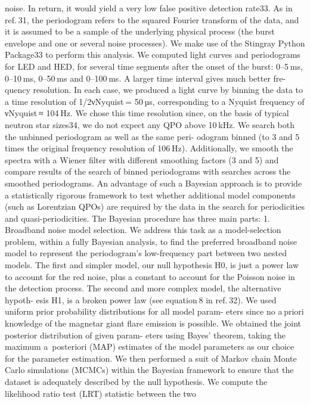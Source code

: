 noise. In return, it would yield a very low false positive detection rate33.
As in ref. 31, the periodogram refers to the squared Fourier transform
of the data, and it is assumed to be a sample of the underlying physical
process (the burst envelope and one or several noise processes).
We make use of the Stingray Python Package33 to perform this analysis.
We computed light curves and periodograms for LED and HED, for
several time segments after the onset of the burst: 0–5 ms, 0–10 ms,
0–50 ms and 0–100 ms. A larger time interval gives much better fre-
quency resolution. In each case, we produced a light curve by binning
the data to a time resolution of 1/2νNyquist = 50 µs, corresponding to a
Nyquist frequency of νNyquist ≈ 104 Hz. We chose this time resolution
since, on the basis of typical neutron star sizes34, we do not expect any
QPO above 10 kHz.
We search both the unbinned periodogram as well as the same peri-
odogram binned (to 3 and 5 times the original frequency resolution
of 106 Hz). Additionally, we smooth the spectra with a Wiener filter
with different smoothing factors (3 and 5) and compare results of the
search of binned periodograms with searches across the smoothed
periodograms.
An advantage of such a Bayesian approach is to provide a statistically
rigorous framework to test whether additional model components
(such as Lorentzian QPOs) are required by the data in the search for
periodicities and quasi-periodicities. The Bayesian procedure has three
main parts:
1. Broadband noise model selection. We address this task as a
model-selection problem, within a fully Bayesian analysis, to find the
preferred broadband noise model to represent the periodogram’s
low-frequency part between two nested models. The first and simpler
model, our null hypothesis H0, is just a power law to account for the red
noise, plus a constant to account for the Poisson noise in the detection
process. The second and more complex model, the alternative hypoth-
esis H1, is a broken power law (see equation 8 in ref. 32).
We used uniform prior probability distributions for all model param-
eters since no a priori knowledge of the magnetar giant flare emission is
possible. We obtained the joint posterior distribution of given param-
eters using Bayes’ theorem, taking the maximum a posteriori (MAP)
estimates of the model parameters as our choice for the parameter
estimation. We then performed a suit of Markov chain Monte Carlo
simulations (MCMCs) within the Bayesian framework to ensure that
the dataset is adequately described by the null hypothesis.
We compute the likelihood ratio test (LRT) statistic between the two
